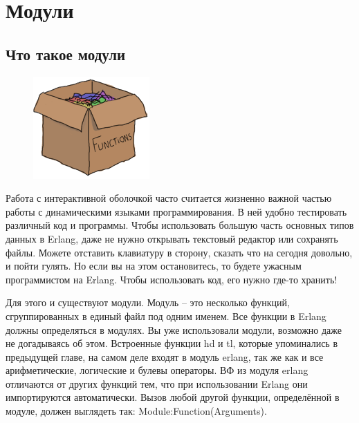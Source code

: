 \documentclass[a4paper,12pt]{report}
\newcommand{\ops}{\colorbox{lgreen}}
\begin{document}
\chapter{Модули}
\label{modules}
\section{Что такое модули}
\begin{figure}
    \includegraphics[width=1\linewidth]{modules.png}
\end{figure}

Работа с интерактивной оболочкой часто считается жизненно важной частью работы с динамическими языками программирования. В ней удобно тестировать различный код и программы. Чтобы использовать большую часть основных типов данных в Erlang, даже не нужно открывать текстовый редактор или сохранять файлы. Можете отставить клавиатуру в сторону, сказать что на сегодня довольно, и пойти гулять. Но если вы на этом остановитесь, то будете ужасным программистом на Erlang. Чтобы использовать код, его нужно где\--то хранить!

Для этого и существуют модули. Модуль \--- это несколько функций, сгруппированных в единый файл под одним именем. Все функции в Erlang должны определяться в модулях. Вы уже использовали модули, возможно даже не догадываясь об этом. Встроенные функции \ops{hd} и \ops{tl}, которые упоминались в предыдущей главе, на самом деле входят в модуль \ops{erlang}, так же как и все арифметические, логические и булевы операторы. ВФ из модуля \ops{erlang} отличаются от других функций тем, что при использовании Erlang они импортируются автоматически. Вызов любой другой функции, определённой в модуле, должен выглядеть так: \ops{Module:Function(Arguments)}.
\end{document}
